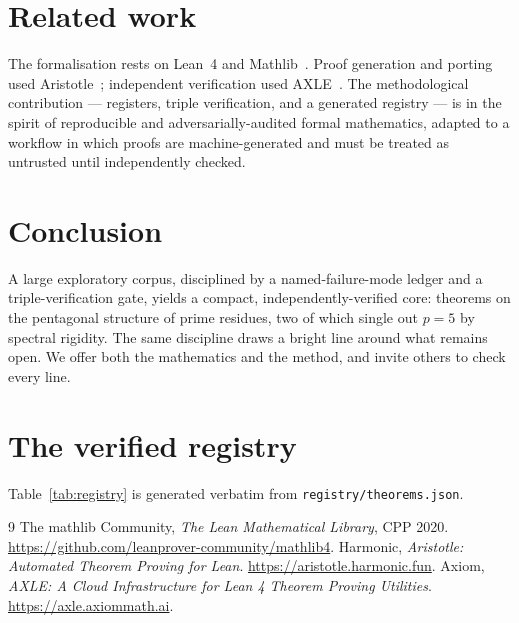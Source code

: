 \documentclass[11pt]{article}
\theoremstyle{definition}
\theoremstyle{remark}
\newcommand{\lean}[1]{\texttt{#1}}
\begin{document}
\section{Related work}
The formalisation rests on Lean~4 and Mathlib~\cite{mathlib}. Proof generation and porting used
Aristotle~\cite{aristotle}; independent verification used AXLE~\cite{axle}. The methodological
contribution --- registers, triple verification, and a generated registry --- is in the spirit
of reproducible and adversarially-audited formal mathematics, adapted to a workflow in which
proofs are machine-generated and must be treated as untrusted until independently checked.

\section{Conclusion}
A large exploratory corpus, disciplined by a named-failure-mode ledger and a
triple-verification gate, yields a compact, independently-verified core: \nTheorems{}
theorems on the pentagonal structure of prime residues, two of which single out $p=5$ by
spectral rigidity. The same discipline draws a bright line around what remains open. We offer
both the mathematics and the method, and invite others to check every line.

\appendix
\section{The verified registry}
Table~\ref{tab:registry} is generated verbatim from \lean{registry/theorems.json}.


\begin{thebibliography}{9}
 The mathlib Community, \emph{The Lean Mathematical Library}, CPP 2020.
  \url{https://github.com/leanprover-community/mathlib4}.
 Harmonic, \emph{Aristotle: Automated Theorem Proving for Lean}.
  \url{https://aristotle.harmonic.fun}.
 Axiom, \emph{AXLE: A Cloud Infrastructure for Lean 4 Theorem Proving Utilities}.
  \url{https://axle.axiommath.ai}.
\end{thebibliography}
\end{document}

